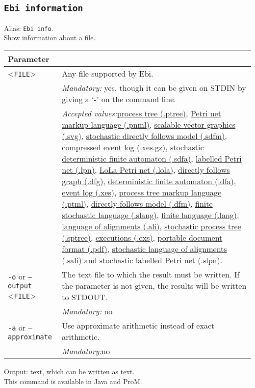 {\subsection{\texttt{Ebi information}}
\label{command:Ebi information}
Alias: \texttt{Ebi info}.\\
Show information about a file.\\
\begin{tabularx}{\linewidth}{lX}
\toprule
Parameter \\\midrule
<\texttt{FILE}>&Any file supported by Ebi.\\
&\textit{Mandatory:} \quad yes, though it can be given on STDIN by giving a `-' on the command line.\\
&\textit{Accepted values:}\quad \hyperref[filehandler:process tree]{process tree (.ptree)}, \hyperref[filehandler:Petri net markup language]{Petri net markup language (.pnml)}, \hyperref[filehandler:scalable vector graphics]{scalable vector graphics (.svg)}, \hyperref[filehandler:stochastic directly follows model]{stochastic directly follows model (.sdfm)}, \hyperref[filehandler:compressed event log]{compressed event log (.xes.gz)}, \hyperref[filehandler:stochastic deterministic finite automaton]{stochastic deterministic finite automaton (.sdfa)}, \hyperref[filehandler:labelled Petri net]{labelled Petri net (.lpn)}, \hyperref[filehandler:LoLa Petri net]{LoLa Petri net (.lola)}, \hyperref[filehandler:directly follows graph]{directly follows graph (.dfg)}, \hyperref[filehandler:deterministic finite automaton]{deterministic finite automaton (.dfa)}, \hyperref[filehandler:event log]{event log (.xes)}, \hyperref[filehandler:process tree markup language]{process tree markup language (.ptml)}, \hyperref[filehandler:directly follows model]{directly follows model (.dfm)}, \hyperref[filehandler:finite stochastic language]{finite stochastic language (.slang)}, \hyperref[filehandler:finite language]{finite language (.lang)}, \hyperref[filehandler:language of alignments]{language of alignments (.ali)}, \hyperref[filehandler:stochastic process tree]{stochastic process tree (.sptree)}, \hyperref[filehandler:executions]{executions (.exs)}, \hyperref[filehandler:portable document format]{portable document format (.pdf)}, \hyperref[filehandler:stochastic language of alignments]{stochastic language of alignments (.sali)} and \hyperref[filehandler:stochastic labelled Petri net]{stochastic labelled Petri net (.slpn)}.\\
\texttt{-o} or \texttt{--output} <\texttt{FILE}> &
The text file to which the result must be written. If the parameter is not given, the results will be written to STDOUT.\\
&\textit{Mandatory:} \quad no\\
\texttt{-a} or \texttt{--approximate} & Use approximate arithmetic instead of exact arithmetic.\\
&\textit{Mandatory:}\quad no\\
\bottomrule
\end{tabularx}
\noindent Output: text, which can be written as  text.
\\This command is available in Java and ProM.
}
